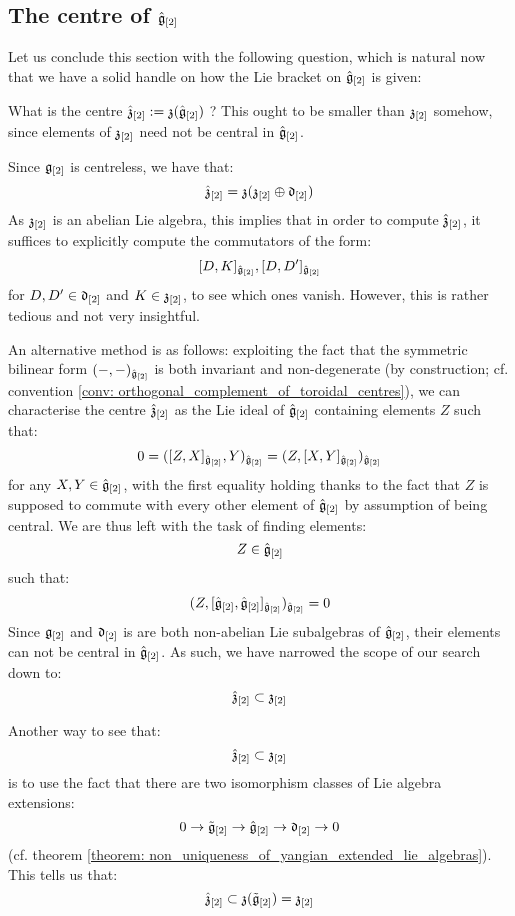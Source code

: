    \subsection{The centre of \texorpdfstring{$\hat{\mathfrak{g}}_{[2]}$}{}}
        Let us conclude this section with the following question, which is natural now that we have a solid handle on how the Lie bracket on $\hat{\mathfrak{g}}_{[2]}$ is given:
        \begin{question}
            What is the centre $\hat{\mathfrak{z}}_{[2]} := \mathfrak{z}( \hat{\mathfrak{g}}_{[2]} )$ ? This ought to be smaller than $\mathfrak{z}_{[2]}$ somehow, since elements of $\mathfrak{z}_{[2]}$ need not be central in $\hat{\mathfrak{g}}_{[2]}$. 
        \end{question}
        \begin{remark}
            Since $\mathfrak{g}_{[2]}$ is centreless, we have that:
                $$\hat{\mathfrak{z}}_{[2]} = \mathfrak{z}( \mathfrak{z}_{[2]} \oplus \mathfrak{d}_{[2]} )$$
            As $\mathfrak{z}_{[2]}$ is an abelian Lie algebra, this implies that in order to compute $\hat{\mathfrak{z}}_{[2]}$, it suffices to explicitly compute the commutators of the form:
                $$[D, K]_{\hat{\mathfrak{g}}_{[2]}}, [D, D']_{\hat{\mathfrak{g}}_{[2]}}$$
            for $D, D' \in \mathfrak{d}_{[2]}$ and $K \in \mathfrak{z}_{[2]}$, to see which ones vanish. However, this is rather tedious and not very insightful.
            
            An alternative method is as follows: exploiting the fact that the symmetric bilinear form $(-, -)_{\hat{\mathfrak{g}}_{[2]}}$ is both invariant and non-degenerate (by construction; cf. convention \ref{conv: orthogonal_complement_of_toroidal_centres}), we can characterise the centre $\hat{\mathfrak{z}}_{[2]}$ as the Lie ideal of $\hat{\mathfrak{g}}_{[2]}$ containing elements $Z$ such that:
                $$0 = ([Z, X]_{\hat{\mathfrak{g}}_{[2]}}, Y)_{\hat{\mathfrak{g}}_{[2]}} = (Z, [X, Y]_{\hat{\mathfrak{g}}_{[2]}})_{\hat{\mathfrak{g}}_{[2]}}$$
            for any $X, Y \in \hat{\mathfrak{g}}_{[2]}$, with the first equality holding thanks to the fact that $Z$ is supposed to commute with every other element of $\hat{\mathfrak{g}}_{[2]}$ by assumption of being central. We are thus left with the task of finding elements:
                $$Z \in \hat{\mathfrak{g}}_{[2]}$$
            such that:
                $$(Z, [\hat{\mathfrak{g}}_{[2]}, \hat{\mathfrak{g}}_{[2]}]_{\hat{\mathfrak{g}}_{[2]}})_{\hat{\mathfrak{g}}_{[2]}} = 0$$
            Since $\mathfrak{g}_{[2]}$ and $\mathfrak{d}_{[2]}$ is are both non-abelian Lie subalgebras of $\hat{\mathfrak{g}}_{[2]}$, their elements can not be central in $\hat{\mathfrak{g}}_{[2]}$. As such, we have narrowed the scope of our search down to:
                $$\hat{\mathfrak{z}}_{[2]} \subset \mathfrak{z}_{[2]}$$

            Another way to see that:
                $$\hat{\mathfrak{z}}_{[2]} \subset \mathfrak{z}_{[2]}$$
            is to use the fact that there are two isomorphism classes of Lie algebra extensions:
                $$0 \to \tilde{\mathfrak{g}}_{[2]} \to \hat{\mathfrak{g}}_{[2]} \to \mathfrak{d}_{[2]} \to 0$$
            (cf. theorem \ref{theorem: non_uniqueness_of_yangian_extended_lie_algebras}). This tells us that:
                $$\hat{\mathfrak{z}}_{[2]} \subset \mathfrak{z}(\tilde{\mathfrak{g}}_{[2]}) = \mathfrak{z}_{[2]}$$
        \end{remark}
